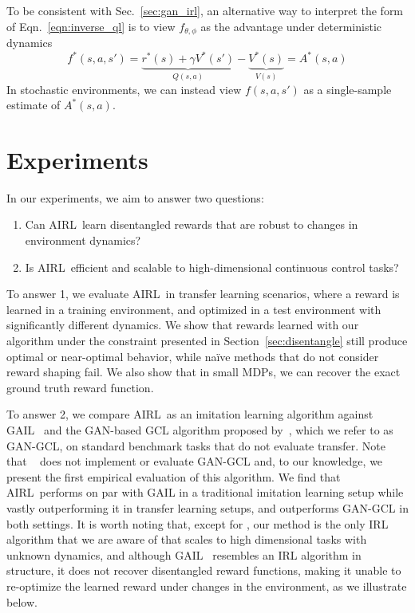 \documentclass{article} \usepackage{iclr2018_conference,times}
\newcommand{\algnameabbrev}{AIRL}
\begin{document}
To be consistent with Sec.~\ref{sec:gan_irl}, an alternative way to interpret the form of Eqn.~\ref{eqn:inverse_ql} is to view $f_{\theta, \phi}$ as the advantage under deterministic dynamics
\[
f^*(s,a,s') = \underbrace{r^*(s) + \gamma V^*(s')}_{Q(s,a)} - \underbrace{V^*(s)}_{V(s)} = A^*(s,a)
\]
In stochastic environments, we can instead view $f(s,a,s')$ as a single-sample estimate of $A^*(s,a)$.

 
\section{Experiments}
In our experiments, we aim to answer two questions:
\begin{enumerate}
\item Can \algnameabbrev\ learn disentangled rewards that are robust to changes in environment dynamics?
\item Is \algnameabbrev\ efficient and scalable to high-dimensional continuous control tasks?
\end{enumerate}
To answer 1, we evaluate \algnameabbrev\ in transfer learning scenarios, where a reward is learned in a training environment, and optimized in a test environment with significantly different dynamics. We show that rewards learned with our algorithm under the constraint presented in Section~\ref{sec:disentangle} still produce optimal or near-optimal behavior, while na\"ive methods that do not consider reward shaping fail. We also show that in small MDPs, we can recover the exact ground truth reward function.

To answer 2, we compare \algnameabbrev\ as an imitation learning algorithm against GAIL~\citep{Ho16b} and the GAN-based GCL algorithm proposed by~\citet{Finn16b}, which we refer to as GAN-GCL, on standard benchmark tasks that do not evaluate transfer. Note that ~\citet{Finn16b} does not implement or evaluate GAN-GCL and, to our knowledge, we present the first empirical evaluation of this algorithm. We find that \algnameabbrev\ performs on par with GAIL in a traditional imitation learning setup while vastly outperforming it in transfer learning setups, and outperforms GAN-GCL in both settings. It is worth noting that, except for \citep{Finn16a}, our method is the only IRL algorithm that we are aware of that scales to high dimensional tasks with unknown dynamics, and although GAIL~\citep{Ho16b} resembles an IRL algorithm in structure, it does not recover disentangled reward functions, making it unable to re-optimize the learned reward under changes in the environment, as we illustrate below.
\end{document}
